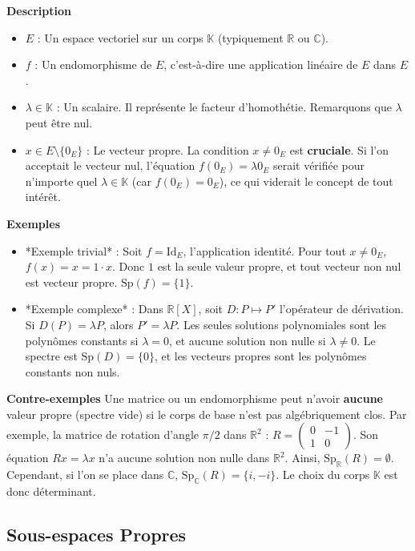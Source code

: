 \documentclass[11pt,a4paper]{article}
\begin{document}
\textbf{Description}
\begin{itemize}
\item $E$ : Un espace vectoriel sur un corps $\mathbb{K}$ (typiquement $\mathbb{R}$ ou $\mathbb{C}$).
\item $f$ : Un endomorphisme de $E$, c'est-à-dire une application linéaire de $E$ dans $E$.
\item $\lambda \in \mathbb{K}$ : Un scalaire. Il représente le facteur d'homothétie. Remarquons que $\lambda$ peut être nul.
\item $x \in E \setminus \{0_E\}$ : Le vecteur propre. La condition $x \neq 0_E$ est \textbf{cruciale}. Si l'on acceptait le vecteur nul, l'équation $f(0_E) = \lambda 0_E$ serait vérifiée pour n'importe quel $\lambda \in \mathbb{K}$ (car $f(0_E)=0_E$), ce qui viderait le concept de tout intérêt.
\end{itemize}
\textbf{Exemples}
\begin{itemize}
\item *Exemple trivial* : Soit $f = \text{Id}_E$, l'application identité. Pour tout $x \neq 0_E$, $f(x) = x = 1 \cdot x$. Donc $1$ est la seule valeur propre, et tout vecteur non nul est vecteur propre. $\text{Sp}(f) = \{1\}$.
\item *Exemple complexe* : Dans $\mathbb{R}[X]$, soit $D : P \mapsto P'$ l'opérateur de dérivation. Si $D(P) = \lambda P$, alors $P' = \lambda P$. Les seules solutions polynomiales sont les polynômes constants si $\lambda = 0$, et aucune solution non nulle si $\lambda \neq 0$. Le spectre est $\text{Sp}(D) = \{0\}$, et les vecteurs propres sont les polynômes constants non nuls.
\end{itemize}
\textbf{Contre-exemples}
Une matrice ou un endomorphisme peut n'avoir \textbf{aucune} valeur propre (spectre vide) si le corps de base n'est pas algébriquement clos. Par exemple, la matrice de rotation d'angle $\pi/2$ dans $\mathbb{R}^2$ : $R = \begin{pmatrix} 0 & -1 \\ 1 & 0 \end{pmatrix}$. Son équation $R x = \lambda x$ n'a aucune solution non nulle dans $\mathbb{R}^2$. Ainsi, $\text{Sp}_{\mathbb{R}}(R) = \emptyset$. Cependant, si l'on se place dans $\mathbb{C}$, $\text{Sp}_{\mathbb{C}}(R) = \{i, -i\}$. Le choix du corps $\mathbb{K}$ est donc déterminant.

\subsection{Sous-espaces Propres}
\end{document}

